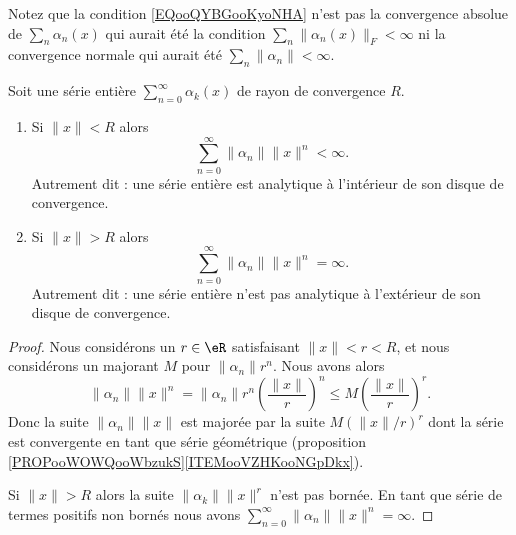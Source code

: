 \begin{normaltext}
	Notez que la condition \eqref{EQooQYBGooKyoNHA} n'est pas la convergence absolue de \( \sum_n\alpha_n(x)\) qui aurait été la condition \( \sum_n\| \alpha_n(x) \|_F<\infty\) ni la convergence normale qui aurait été \( \sum_n\| \alpha_n \|<\infty\).
\end{normaltext}

\begin{proposition}	\label{PROPooHCYXooHlUEuV}
	Soit une série entière \( \sum_{n=0}^{\infty}\alpha_k(x)\) de rayon de convergence \( R\).

	\begin{enumerate}
		\item		\label{ITEMooVAOTooELMOlK}
		      Si \( \| x \|<R\) alors
		      \begin{equation}
			      \sum_{n=0}^{\infty}\| \alpha_n \|\| x \|^n<\infty.
		      \end{equation}
		      Autrement dit : une série entière est analytique à l'intérieur de son disque de convergence.
		\item	\label{ITEMooEEVMooVeiHyY}
		      Si \( \| x \|>R\) alors
		      \begin{equation}
			      \sum_{n=0}^{\infty}\| \alpha_n \|\| x \|^n=\infty.
		      \end{equation}
		      Autrement dit : une série entière n'est pas analytique à l'extérieur de son disque de convergence.
	\end{enumerate}
\end{proposition}

\begin{proof}
	Nous considérons un \( r\in \eR\) satisfaisant \( \| x \|<r<R\), et nous considérons un majorant \( M\) pour \( \| \alpha_n \|r^n\). Nous avons alors
	\begin{equation}
		\| \alpha_n \|\| x \|^n=\| \alpha_n \|r^n\left( \frac{ \| x \| }{ r } \right)^n\leq M\left( \frac{ \| x \| }{ r } \right)^r.
	\end{equation}
	Donc la suite \( \| \alpha_n \|\| x \|\) est majorée par la suite \( M(\| x \|/r)^r\) dont la série est convergente en tant que série géométrique (proposition \ref{PROPooWOWQooWbzukS}\ref{ITEMooVZHKooNGpDkx}).

	Si \( \| x \|>R\) alors la suite \( \| \alpha_k \|\| x \|^r\) n'est pas bornée. En tant que série de termes positifs non bornés nous avons \( \sum_{n=0}^{\infty}\| \alpha_n \|\| x \|^n=\infty\).
\end{proof}


